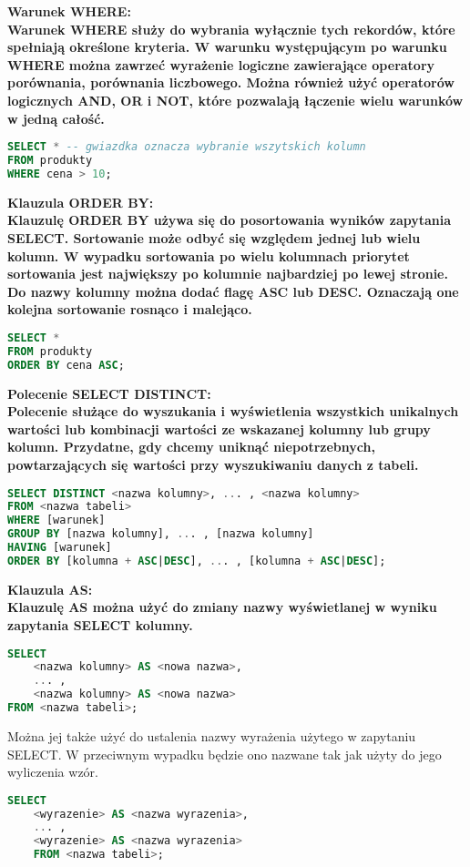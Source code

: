 \documentclass[a4paper,12pt]{article}
\newcommand{\h}[1]{\noindent \bf #1 \rm \\ \noindent}
\begin{document}
\h{Warunek WHERE:}
Warunek WHERE służy do wybrania wyłącznie tych rekordów, które spełniają określone kryteria. W warunku występującym po warunku WHERE można zawrzeć wyrażenie logiczne zawierające operatory porównania, porównania liczbowego. Można również użyć operatorów logicznych AND, OR i NOT, które pozwalają łączenie wielu warunków w jedną całość.
\begin{lstlisting}[language=SQL]
SELECT * -- gwiazdka oznacza wybranie wszytskich kolumn
FROM produkty
WHERE cena > 10;
\end{lstlisting}
\vspace{5mm}

\h{Klauzula ORDER BY:}
Klauzulę ORDER BY używa się do posortowania wyników zapytania SELECT. Sortowanie może odbyć się względem jednej lub wielu kolumn. W wypadku sortowania po wielu kolumnach priorytet sortowania jest największy po kolumnie najbardziej po lewej stronie. Do nazwy kolumny można dodać flagę ASC lub DESC. Oznaczają one kolejna sortowanie rosnąco i malejąco.
\begin{lstlisting}[language=SQL]
SELECT *
FROM produkty
ORDER BY cena ASC;
\end{lstlisting}
\vspace{5mm}

\h{Polecenie SELECT DISTINCT:}
Polecenie służące do wyszukania i wyświetlenia wszystkich unikalnych wartości lub kombinacji wartości ze wskazanej kolumny lub grupy kolumn. Przydatne, gdy chcemy uniknąć niepotrzebnych, powtarzających się wartości przy wyszukiwaniu danych z tabeli.
\begin{lstlisting}[language=SQL]
SELECT DISTINCT <nazwa kolumny>, ... , <nazwa kolumny>
FROM <nazwa tabeli>
WHERE [warunek]
GROUP BY [nazwa kolumny], ... , [nazwa kolumny]
HAVING [warunek]
ORDER BY [kolumna + ASC|DESC], ... , [kolumna + ASC|DESC];
\end{lstlisting}
\vspace{5mm}

\h{Klauzula AS:}
Klauzulę AS można użyć do zmiany nazwy wyświetlanej  w wyniku zapytania SELECT kolumny.
\begin{lstlisting}[language=SQL]
SELECT 
	<nazwa kolumny> AS <nowa nazwa>, 
	... , 
	<nazwa kolumny> AS <nowa nazwa>
FROM <nazwa tabeli>;
\end{lstlisting}
\vspace{5mm}

\noindent
Można jej także użyć do ustalenia nazwy wyrażenia użytego w zapytaniu SELECT. W przeciwnym wypadku będzie ono nazwane tak jak użyty do jego wyliczenia wzór.
\begin{lstlisting}[language=SQL]
	SELECT 
	<wyrazenie> AS <nazwa wyrazenia>, 
	... , 
	<wyrazenie> AS <nazwa wyrazenia>
	FROM <nazwa tabeli>;
\end{lstlisting}
\vspace{5mm}
\end{document}
